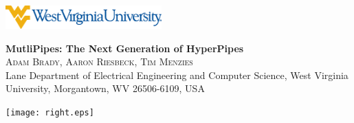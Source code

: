  \parbox[c]{0.1\linewidth}{~}
   \hfill
    \parbox[c]{0.1\linewidth}{\includegraphics[width=6cm]{left.eps}}

    \hfill
    \parbox[c]{0.70\linewidth}{%
      \begin{center}
      {
        \textbf{\Huge{MutliPipes: The Next Generation of HyperPipes}}\\[0.4em]
        \textsc{\normalsize Adam Brady, Aaron Riesbeck, Tim Menzies}\\[0.2em]
        {\normalsize Lane Department of Electrical Engineering and Computer Science, West Virginia University, Morgantown, WV 26506-6109, USA}\\[0.0em]
      }
      \end{center}}
    \hfill
    \parbox[c]{0.15\linewidth}{\texttt{[image: right.eps]}}

